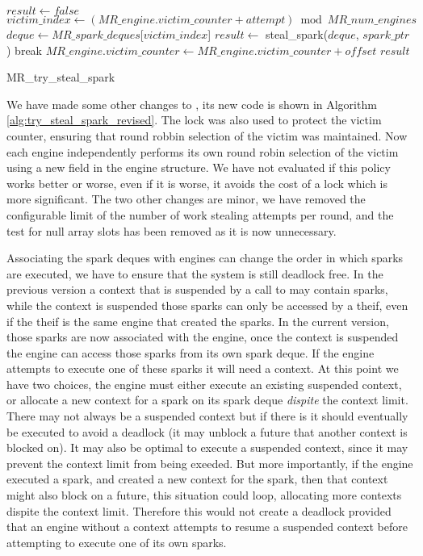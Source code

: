 \begin{algorithm}
\begin{algorithmic}[1]
  \State $result \gets false$
    \State $victim\_index \gets
        (MR\_engine.victim\_counter + attempt) \bmod MR\_num\_engines$
    \State $deque \gets
       MR\_spark\_deques$[$victim\_index$]
    \State $result \gets$ steal\_spark($deque$, $spark\_ptr$)
      \State break
    \EndIf
  \EndFor
  \State $MR\_engine.victim\_counter \gets
    MR\_engine.victim\_counter + offset$
  \State \Return $result$
\EndProcedure
\end{algorithmic}
\caption{MR\_try\_steal\_spark}
\label{alg:try_steal_spark_revised}
\end{algorithm}

We have made some other changes to \trystealspark,
its new code is shown in Algorithm \ref{alg:try_steal_spark_revised}.
The lock was also used to protect the victim counter,
ensuring that round robbin selection of the victim was maintained.
Now each engine independently performs its own round robin selection of the
victim using a new field  in the engine structure.
We have not evaluated if this policy works better or worse,
even if it is worse,
it avoids the cost of a lock which is more significant.
The two other changes are minor,
we have removed the configurable limit of the number of work stealing
attempts per round,
and the test for null array slots has been removed as it is now unnecessary.

Associating the spark deques with engines can change the order in which
sparks are executed,
we have to ensure that the system is still deadlock free.
In the previous version
a context that is suspended by a call to \wait may contain sparks,
while the context is suspended those sparks can only be accessed by a theif,
even if the theif is the same engine that created the sparks.
In the current version,
those sparks are now associated with the engine,
once the context is suspended the engine can access those sparks from its
own spark deque.
If the engine attempts to execute one of these sparks it will need a
context.
At this point we have two choices,
the engine must either execute an existing suspended context,
or allocate a new context for a spark on its spark deque \emph{dispite} the
context limit.
There may not always be a suspended context but if there is it should
eventually be executed to avoid a deadlock
(it may unblock a future that another context is blocked on).
It may also be optimal to execute a suspended context,
since it may prevent the context limit from being exeeded.
But more importantly,
if the engine executed a spark,
and created a new context for the spark,
then that context might also block on a future,
this situation could loop, allocating more contexts dispite the context
limit.
Therefore this would not create a deadlock provided that an engine without a
context attempts to resume a suspended context before attempting to execute
one of its own sparks.

